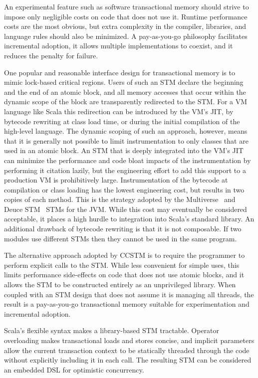
An experimental feature such as software transactional memory should
strive to impose only negligible costs on code that does not use it.
Runtime performance costs are the most obvious, but extra complexity in
the compiler, libraries, and language rules should also be minimized.
A pay-as-you-go philosophy facilitates incremental adoption, it allows
multiple implementations to coexist, and it reduces the penalty for
failure.

One popular and reasonable interface design for transactional memory
is to mimic lock-based critical regions.  Users of such an STM declare
the beginning and the end of an atomic block, and all memory accesses
that occur within the dynamic scope of the block are transparently
redirected to the STM.  For a VM language like Scala this redirection
can be introduced by the VM's JIT, by bytecode rewriting at class load
time, or during the initial compilation of the high-level language.
The dynamic scoping of such an approach, however, means that it is
generally not possible to limit instrumentation to only classes that
are used in an atomic block.  An STM that is deeply integrated into
the VM's JIT can minimize the performance and code bloat impacts of the
instrumentation by performing it citation lazily, but the engineering
effort to add this support to a production VM is prohibitively large.
Instrumentation of the bytecode at compilation or class loading has
the lowest engineering cost, but results in two copies of each method.
This is the strategy adopted by the Multiverse~\cite{multiverse} and Deuce
STM~\cite{deucestm} STMs for the JVM.  While this cost may eventually
be considered acceptable, it places a high hurdle to integration into
Scala's standard library.  An additional drawback of bytecode rewriting
is that it is not composable.  If two modules use different STMs then
they cannot be used in the same program.

The alternative approach adopted by CCSTM is to require the programmer to perform
explicit calls to the STM.  While less convenient for simple uses, this
limits performance side-effects on code that does not use atomic blocks, and it
allows the STM to be constructed entirely as an unprivileged library.
When coupled with an STM design that does not assume it is managing all
threads, the result is a pay-as-you-go transactional memory suitable
for experimentation and incremental adoption.

Scala's flexible syntax makes a library-based STM tractable.  Operator
overloading makes transactional loads and stores concise, and implicit
parameters allow the current transaction context to be statically
threaded through the code without explicitly including it in each call.
The resulting STM can be considered an embedded DSL
for optimistic concurrency.
